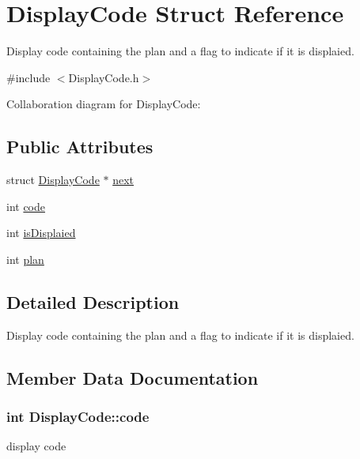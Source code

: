 \hypertarget{structDisplayCode}{}\section{Display\+Code Struct Reference}
\label{structDisplayCode}


Display code containing the plan and a flag to indicate if it is displaied.  




{\ttfamily \#include $<$Display\+Code.\+h$>$}



Collaboration diagram for Display\+Code\+:
\subsection*{Public Attributes}
\begin{DoxyCompactItemize}
\item 
struct \hyperlink{structDisplayCode}{Display\+Code} $\ast$ \hyperlink{structDisplayCode_aad039ce333a70fec29d3a2532b68dbf6}{next}
\item 
int \hyperlink{structDisplayCode_a6de1e7dd7c1bc2905df019ef13858642}{code}
\item 
int \hyperlink{structDisplayCode_a11f90a324991b3b5e13721e7c7be59df}{is\+Displaied}
\item 
int \hyperlink{structDisplayCode_aa6eee6772ad5cb410437a3923c9f3cd6}{plan}
\end{DoxyCompactItemize}


\subsection{Detailed Description}
Display code containing the plan and a flag to indicate if it is displaied. 

\subsection{Member Data Documentation}
\subsubsection[{\texorpdfstring{code}{code}}]{\setlength{\rightskip}{0pt plus 5cm}int Display\+Code\+::code}\hypertarget{structDisplayCode_a6de1e7dd7c1bc2905df019ef13858642}{}\label{structDisplayCode_a6de1e7dd7c1bc2905df019ef13858642}
display code 
